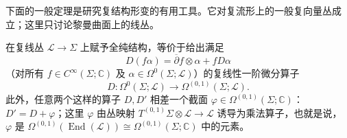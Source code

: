 下面的一般定理是研究复结构形变的有用工具。它对复流形上的一般复向量丛成立；这里只讨论黎曼曲面上的线丛。

\begin{theorem}\label{thm:holomorphic-line-bundle-dolbeault-operator}
在复线丛 $\mathcal L\to\Sigma$ 上赋予全纯结构，等价于给出满足
\begin{equation}
 D(f\alpha)=\overline\partial f\otimes\alpha+fD\alpha
 \label{eq:dolbeault-connection-leibniz}
\end{equation}
（对所有 $f\in C^\infty(\Sigma;\mathbb C)$ 及 $\alpha\in\Omega^0(\Sigma;\mathcal L)$）的复线性一阶微分算子
\[
 D:\Omega^0(\Sigma;\mathcal L)\longrightarrow
 \Omega^{(0,1)}(\Sigma;\mathcal L).
\]
此外，任意两个这样的算子 $D,D'$ 相差一个截面
$\varphi\in\Omega^{(0,1)}(\Sigma;\mathbb C)$：$D'=D+\varphi$；这里 $\varphi$ 由丛映射
$T^{(0,1)}\Sigma\otimes\mathcal L\to\mathcal L$ 诱导为乘法算子，也就是说，
$\varphi$ 是 $\Omega^{(0,1)}(\operatorname{End}(\mathcal L))\cong\Omega^{(0,1)}(\Sigma;\mathbb C)$ 中的元素。
\end{theorem}

